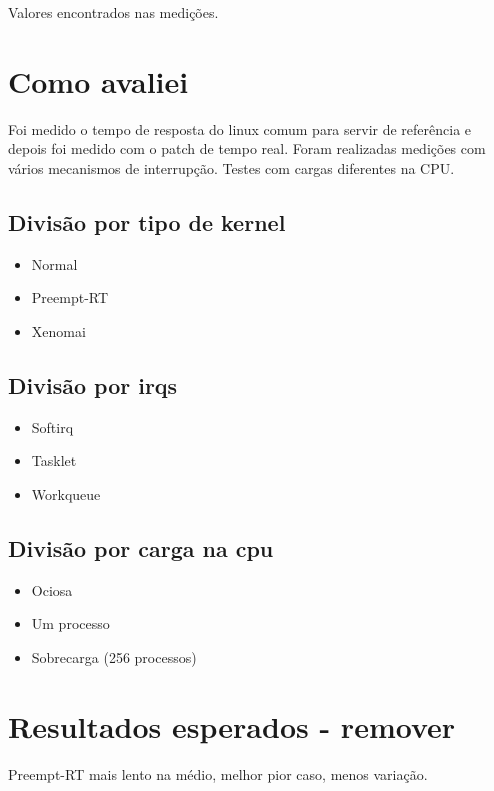 
Valores encontrados nas medições.

\section{Como avaliei}

Foi medido o tempo de resposta do linux comum para servir de referência e depois foi medido com o patch de tempo real. Foram realizadas medições com vários mecanismos de interrupção. Testes com cargas diferentes na CPU.

\subsection{Divisão por tipo de kernel}

\begin{itemize}
\item Normal
\item Preempt-RT
\item Xenomai
\end{itemize}

\subsection{Divisão por irqs}

\begin{itemize}
\item Softirq
\item Tasklet
\item Workqueue
\end{itemize}

\subsection{Divisão por carga na cpu}

\begin{itemize}
\item Ociosa
\item Um processo
\item Sobrecarga (256 processos)
\end{itemize}

\section{Resultados esperados - remover}

Preempt-RT mais lento na médio, melhor pior caso, menos variação.

